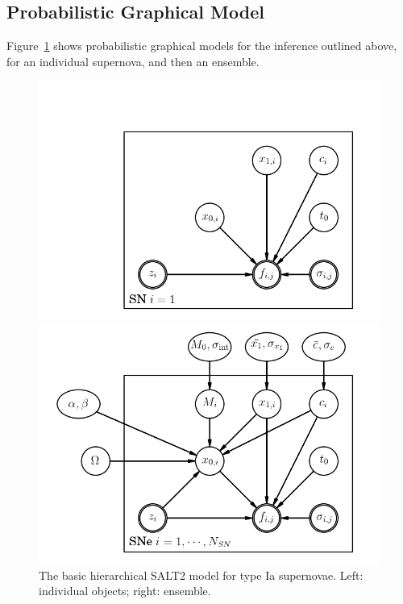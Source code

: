\documentclass{article}[10pt]
\begin{document}
\subsection{Probabilistic Graphical Model}

Figure~\ref{fig:basic} shows probabilistic graphical models for the inference outlined above, for an individual supernova, and then an ensemble.
\begin{figure}[h]
\begin{minipage}{\linewidth}
    \begin{minipage}{0.48\linewidth}
        \includegraphics[width=\linewidth]{images/snpgm_pjm_single.png}
    \end{minipage}
    \begin{minipage}{0.48\linewidth}
        \includegraphics[width=\linewidth]{images/snpgm_pjm.png}
    \end{minipage}
\end{minipage}
\caption{The basic hierarchical SALT2 model for type Ia supernovae. Left: individual objects; right: ensemble.}
\label{fig:basic}
\end{figure}
\end{document}
